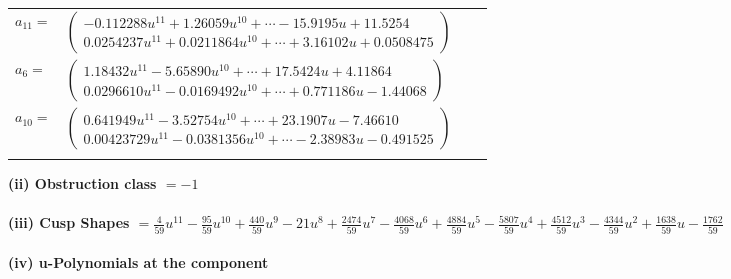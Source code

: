 \documentclass[1p]{elsarticle_modified}
\theoremstyle{definition}
\begin{document}
\begin{tabular}{m{7pt} m{180pt} m{7pt} m{180pt} }
\flushright $a_{11}=$&$\begin{pmatrix}-0.112288 u^{11}+1.26059 u^{10}+\cdots-15.9195 u+11.5254\\0.0254237 u^{11}+0.0211864 u^{10}+\cdots+3.16102 u+0.0508475\end{pmatrix}$ \\
\flushright $a_{6}=$&$\begin{pmatrix}1.18432 u^{11}-5.65890 u^{10}+\cdots+17.5424 u+4.11864\\0.0296610 u^{11}-0.0169492 u^{10}+\cdots+0.771186 u-1.44068\end{pmatrix}$ \\
\flushright $a_{10}=$&$\begin{pmatrix}0.641949 u^{11}-3.52754 u^{10}+\cdots+23.1907 u-7.46610\\0.00423729 u^{11}-0.0381356 u^{10}+\cdots-2.38983 u-0.491525\end{pmatrix}$\\&\end{tabular}
\flushleft \textbf{(ii) Obstruction class $= -1$}\\~\\
\flushleft \textbf{(iii) Cusp Shapes $= \frac{4}{59} u^{11}-\frac{95}{59} u^{10}+\frac{440}{59} u^9-21 u^8+\frac{2474}{59} u^7-\frac{4068}{59} u^6+\frac{4884}{59} u^5-\frac{5807}{59} u^4+\frac{4512}{59} u^3-\frac{4344}{59} u^2+\frac{1638}{59} u-\frac{1762}{59}$}\\~\\
\newpage\renewcommand{\arraystretch}{1}
\flushleft \textbf{(iv) u-Polynomials at the component}\newline \\
\end{document}
